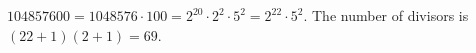 $104857600=1048576\cdot100=2^{20}\cdot2^2\cdot5^2=2^{22}\cdot5^2$. The number of divisors is $(22+1)(2+1)=\boxed{69}$.
